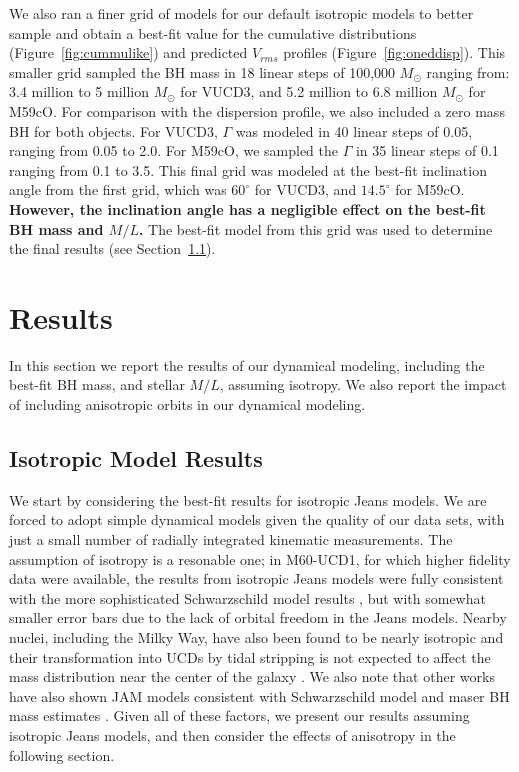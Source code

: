 \documentclass{aastex}
\begin{document}
We also ran a finer grid of models for our default isotropic models to better sample and obtain a best-fit value for the cumulative distributions (Figure~\ref{fig:cummulike}) and predicted $V_{rms}$ profiles (Figure~\ref{fig:oneddisp}). This smaller grid sampled the BH mass in 18 linear steps of 100,000 $M_{\odot}$ ranging from: 3.4 million to 5 million $M_{\odot}$ for VUCD3, and 5.2 million to 6.8 million $M_{\odot}$ for M59cO. For comparison with the dispersion profile, we also included a zero mass BH for both objects. For VUCD3, $\Gamma$ was modeled in 40 linear steps of 0.05, ranging from 0.05 to 2.0. For M59cO, we sampled the $\Gamma$ in 35 linear steps of 0.1 ranging from 0.1 to 3.5. This final grid was modeled at the best-fit inclination angle from the first grid, which was $60^{\circ}$ for VUCD3, and $14.5^{\circ}$ for M59cO. \textbf{However, the inclination angle has a negligible effect on the best-fit BH mass and $M/L$.} The best-fit model from this grid was used to determine the final results (see Section~\ref{sec:isotropy}).


\section{Results} \label{sec:result}

In this section we report the results of our dynamical modeling, including the best-fit BH mass, and stellar $M/L$, assuming isotropy. We also report the impact of including anisotropic orbits in our dynamical modeling.

\subsection{Isotropic Model Results} \label{sec:isotropy}

We start by considering the best-fit results for isotropic Jeans models.  We are forced to adopt simple dynamical models given the quality of our data sets, with just a small number of radially integrated kinematic measurements. The assumption of isotropy is a resonable one; in M60-UCD1, for which higher fidelity data were available, the results from isotropic Jeans models were fully consistent with the more sophisticated Schwarzschild model results \citep{seth14}, but with somewhat smaller error bars due to the lack of orbital freedom in the Jeans models.  Nearby nuclei, including the Milky Way, have also been found to be nearly isotropic \citep{schodel09,verolme02,cappellari09,hartmann11,nguyen16} and their transformation into UCDs by tidal stripping is not expected to affect the mass distribution near the center of the galaxy \citep[e.g.][]{pfeffer13}.  We also note that other works have also shown JAM models consistent with Schwarzschild model and maser BH mass estimates \citep{cappellari09,cappellari10,drehmer15}.  Given all of these factors, we present our results assuming isotropic Jeans models, and then consider the effects of anisotropy in the following section.
\end{document}
